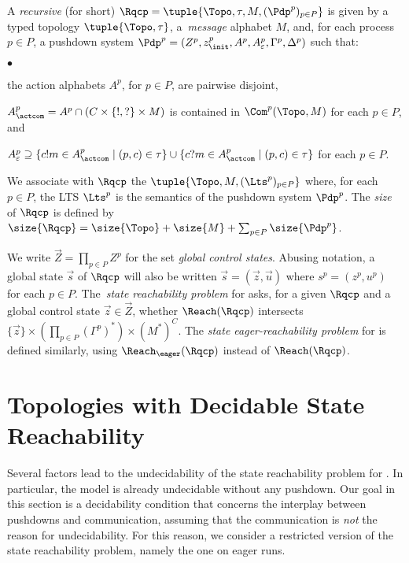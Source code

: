 \documentclass{LMCS}
\newenvironment{definition}{\begin{defi}}{\end{defi}}
\begin{document}
\begin{definition}
  A \emph{recursive \qcp} (\rqcp for short)
  $\Rqcp=\tuple{\Topo,\tau,M,(\Pdp^p)_{p\in P}}$ is given by a typed
  topology $\tuple{\Topo,\tau}$, a~\emph{message} alphabet $M$, and,
  for each  process $p\in P$,  a
  pushdown system
  $\Pdp^p=(Z^p,z_\init^p,A^p,A^p_\varepsilon,\Gamma^p,\Delta^p)$ such that:
  \begin{iteMize}{$\bullet$}
  \item the action alphabets $A^p$, for $p \in P$, are pairwise disjoint,
  \item $A^p_\actcom = A^p \cap (C\times\{!,?\}\times M)$ is contained in
    $\Com^p(\Topo,M)$ for each $p \in P$, and
  \item $A^p_\varepsilon \supseteq \{c!m \in A^p_\actcom \mid (p, c) \in \tau\} \cup
    \{c?m \in A^p_\actcom \mid (p, c) \in \tau\}$ for each $p \in P$.
  \end{iteMize}
\end{definition}
We associate with $\Rqcp$ the \qcp $\tuple{\Topo,M,(\Lts^p)_{p\in P}}$
where, for each $p \in P$, the LTS $\Lts^p$ is the semantics of the
pushdown system $\Pdp^p$.
The \emph{size} of $\Rqcp$ is defined by
$\size{\Rqcp} = \size{\Topo} + \size{M} + \sum_{p \in P} \size{\Pdp^p}$.



\smallskip

We write $\vec{Z}=\prod_{p\in P}Z^p$ for the set
\emph{global control states}.
Abusing notation, a global state $\vec{s}$ of $\Rqcp$ will also be written
$\vec{s} = (\vec{z}, \vec{u})$ where $s^p = (z^p, u^p)$ for each $p \in P$.
The~\emph{state reachability problem} for \rqcp
asks, for a given \rqcp
$\Rqcp$ and a global control state $\vec{z} \in \vec{Z}$, whether
$\Reach(\Rqcp)$
intersects
$\{\vec{z}\} \times (\prod_{p \in P} (\Gamma^p)^*) \times (M^*)^C$.
The \emph{state eager-reachability problem} for \rqcp is defined similarly,
using $\Reach_\eager(\Rqcp)$ instead of $\Reach(\Rqcp)$.


 \section{Topologies with Decidable State Reachability}
   \label{sect:converge}

   Several factors lead to the undecidability of the state
   reachability problem for \rqcp.  In particular, the model is
   already undecidable without any pushdown.  Our goal in this section
   is a decidability condition that concerns the interplay between
   pushdowns and communication, assuming that the communication is
   \emph{not} the reason for undecidability.  For this reason, we consider a
   restricted version of the state reachability problem, namely the
   one on eager runs. 
\end{document}
